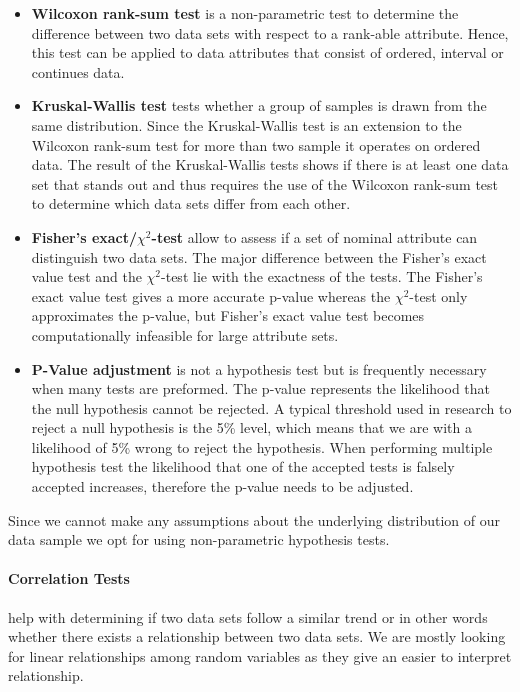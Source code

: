 \begin{itemize}
\item\textbf{Wilcoxon rank-sum test} is a non-parametric test to determine the difference between two data sets with respect to a rank-able attribute.
Hence, this test can be applied to data attributes that consist of ordered, interval or continues data.

\item\textbf{Kruskal-Wallis test} tests whether a group of samples is drawn from the same distribution.
Since the Kruskal-Wallis test is an extension to the Wilcoxon rank-sum test for more than two sample it operates on ordered data.
The result of the Kruskal-Wallis tests shows if there is at least one data set that stands out and thus requires the use of the Wilcoxon rank-sum test to determine which data sets differ from each other.

\item\textbf{Fisher's exact/$\chi^2$-test} allow to assess if a set of nominal attribute can distinguish two data sets. 
The major difference between the Fisher's exact value test and the $\chi^2$-test lie with the exactness of the tests.
The Fisher's exact value test gives a more accurate p-value whereas the $\chi^2$-test only approximates the p-value, but Fisher's exact value test becomes computationally infeasible for large attribute sets.

\item\textbf{P-Value adjustment} is not a hypothesis test but is frequently necessary when many tests are preformed.
The p-value represents the likelihood that the null hypothesis cannot be rejected.
A typical threshold used in research to reject a null hypothesis is the 5\% level, which means that we are with a likelihood of 5\% wrong to reject the hypothesis.
When performing multiple hypothesis test the likelihood that one of the accepted tests is falsely accepted increases, therefore the p-value needs to be adjusted.
\end{itemize}

Since we cannot make any assumptions about the underlying distribution of our data sample we opt for using non-parametric hypothesis tests.


\paragraph{Correlation Tests} help with determining if two data sets follow a similar trend or in other words whether there exists a relationship between two data sets.
We are mostly looking for linear relationships among random variables as they give an easier to interpret relationship.

